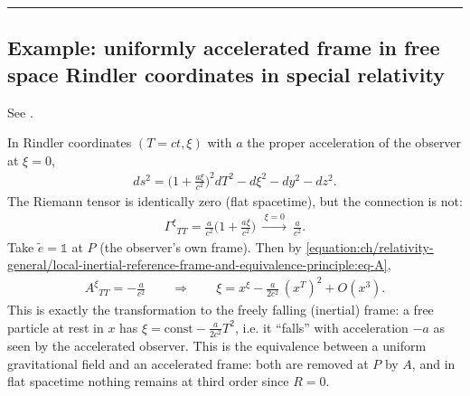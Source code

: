 \documentclass[letterpaper,10pt,english]{jupyterBook}
\begin{document}
\bigskip\hrule\bigskip



\subsection{Example: uniformly accelerated frame in free space \sphinxhyphen{} Rindler coordinates in special relativity}
\label{\detokenize{ch/relativity-general/local-inertial-reference-frame-and-equivalence-principle:example-uniformly-accelerated-frame-in-free-space-rindler-coordinates-in-special-relativity}}
\sphinxAtStartPar
See {\hyperref[\detokenize{ch/relativity-special/rindler:relativity-special-rindler}]{}}.

\sphinxAtStartPar
In Rindler coordinates \((T=ct,\xi)\) with \(a\) the proper acceleration of the observer at \(\xi=0\),
\begin{equation*}
\begin{split}
ds^2=\Big(1+\frac{a\xi}{c^2}\Big)^2dT^2-d\xi^2-dy^2-dz^2 .
\end{split}
\end{equation*}
\sphinxAtStartPar
The Riemann tensor is identically zero (flat spacetime), but the connection is not:
\begin{equation*}
\begin{split}
\Gamma^\xi{}_{TT}=\frac{a}{c^2}\Big(1+\frac{a\xi}{c^2}\Big)\ \xrightarrow{\ \xi=0\ }\ \frac{a}{c^2}.
\end{split}
\end{equation*}
\sphinxAtStartPar
Take \(\tilde e=\mathbb 1\) at \(P\) (the observer’s own frame). Then by \eqref{equation:ch/relativity-general/local-inertial-reference-frame-and-equivalence-principle:eq-A},
\begin{equation*}
\begin{split}
A^\xi{}_{TT}=-\frac{a}{c^2}
\qquad\Longrightarrow\qquad
\xi=x^\xi-\frac{a}{2c^2}\,(x^T)^2+O(x^3).
\end{split}
\end{equation*}
\sphinxAtStartPar
This is exactly the transformation to the freely falling (inertial) frame: a free particle at rest in \(x\) has \(\xi=\text{const}-\tfrac{a}{2c^2}T^2\), i.e. it “falls” with acceleration \(-a\) as seen by the accelerated observer. This is the equivalence between a uniform gravitational field and an accelerated frame: both are removed at \(P\) by \(A\), and in flat spacetime nothing remains at third order since \(R=0\).
\end{document}
